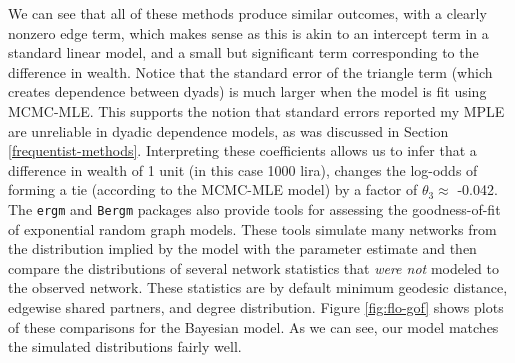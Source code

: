 \documentclass[12pt,twoside]{reedthesis}
\theoremstyle{definition}
\theoremstyle{definition}
\theoremstyle{remark}
\begin{document}
We can see that all of these methods produce similar outcomes, with a
clearly nonzero edge term, which makes sense as this is akin to an
intercept term in a standard linear model, and a small but significant
term corresponding to the difference in wealth. Notice that the standard
error of the triangle term (which creates dependence between dyads) is
much larger when the model is fit using MCMC-MLE. This supports the
notion that standard errors reported my MPLE are unreliable in dyadic
dependence models, as was discussed in Section
\ref{frequentist-methods}. Interpreting these coefficients allows us to
infer that a difference in wealth of 1 unit (in this case 1000 lira),
changes the log-odds of forming a tie (according to the MCMC-MLE model)
by a factor of \(\theta_3 \approx\) -0.042. The \texttt{ergm} and
\texttt{Bergm} packages also provide tools for assessing the
goodness-of-fit of exponential random graph models. These tools simulate
many networks from the distribution implied by the model with the
parameter estimate and then compare the distributions of several network
statistics that \emph{were not} modeled to the observed network. These
statistics are by default minimum geodesic distance, edgewise shared
partners, and degree distribution. Figure \ref{fig:flo-gof} shows plots
of these comparisons for the Bayesian model. As we can see, our model
matches the simulated distributions fairly well.
\end{document}
